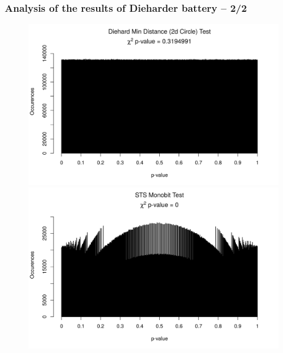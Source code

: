 \documentclass[aspectratio=169]{beamer}
\begin{document}
\begin{frame}
\frametitle{Analysis of the results of Dieharder battery -- 2/2}

\begin{figure}
\begin{nomar}
\centering
\includegraphics[width=.45\paperwidth]{figures/011.png} 
\includegraphics[width=.45\paperwidth]{figures/100.png}
\end{nomar}
\end{figure}

\end{frame}

\end{document}
